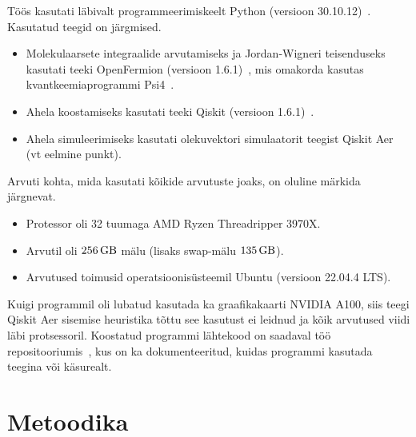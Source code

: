 \documentclass[12pt]{report}
\begin{document}
Töös kasutati läbivalt programmeerimiskeelt Python (versioon 30.10.12)~\cite{python}.
Kasutatud teegid on järgmised.
\begin{itemize}
  \item Molekulaarsete integraalide arvutamiseks ja Jordan-Wigneri teisenduseks kasutati teeki OpenFermion (versioon 1.6.1)~\cite{openfermion}, mis omakorda kasutas kvantkeemiaprogrammi Psi4~\cite{psi4}.
  \item Ahela koostamiseks kasutati teeki Qiskit (versioon 1.6.1)~\cite{qiskit}.
  \item Ahela simuleerimiseks kasutati olekuvektori simulaatorit teegist Qiskit Aer (vt eelmine punkt).
\end{itemize}
Arvuti kohta, mida kasutati kõikide arvutuste joaks, on oluline märkida järgnevat.
\begin{itemize}
  \item Protessor oli 32 tuumaga AMD Ryzen Threadripper 3970X.
  \item Arvutil oli \(256\,{\rm GB}\) mälu (lisaks swap-mälu \(135\,{\rm GB}\)).
  \item Arvutused toimusid operatsioonisüsteemil Ubuntu (versioon 22.04.4 LTS).
\end{itemize}
Kuigi programmil oli lubatud kasutada ka graafikakaarti NVIDIA A100, siis teegi Qiskit Aer sisemise heuristika tõttu see kasutust ei leidnud ja kõik arvutused viidi läbi protsessoril.
Koostatud programmi lähtekood on saadaval töö repositooriumis~\cite{repo}, kus on ka dokumenteeritud, kuidas programmi kasutada teegina või käsurealt.

\section{Metoodika}
\end{document}
